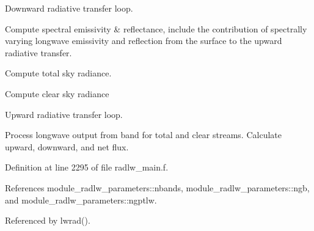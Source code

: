 \begin{DoxyEnumerate}
\item Downward radiative transfer loop.
\item Compute spectral emissivity \& reflectance, include the contribution of spectrally varying longwave emissivity and reflection from the surface to the upward radiative transfer.
\item Compute total sky radiance.
\item Compute clear sky radiance
\item Upward radiative transfer loop.
\item Process longwave output from band for total and clear streams. Calculate upward, downward, and net flux. 
\end{DoxyEnumerate}

Definition at line 2295 of file radlw\+\_\+main.\+f.



References module\+\_\+radlw\+\_\+parameters\+::nbands, module\+\_\+radlw\+\_\+parameters\+::ngb, and module\+\_\+radlw\+\_\+parameters\+::ngptlw.



Referenced by lwrad().

\mbox{\label{group__module__radlw__main_ga1445abd529b76abe7ffb80e843d9fafc}} 
